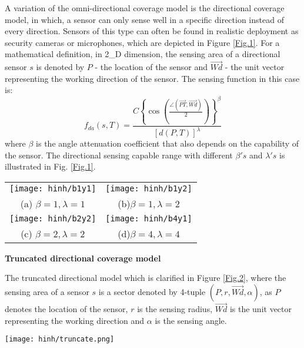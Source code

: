 \documentclass[final]{elsarticle}
\begin{document}
A variation of the omni-directional coverage model is the directional coverage model, in which, a sensor can only sense well in a specific direction instead of every direction. Sensors of this type can often be found in realistic deployment as security cameras or microphones, which are depicted in Figure \ref{Fig.1}. For a mathematical definition, in 2\_D dimension, the sensing area of a directional sensor $ s $ is denoted by $ P $ - the location of the sensor and $ \overrightarrow{Wd}$ - the unit vector representing the working direction of the sensor. The sensing function in this case is:
\begin{equation}
\label{eq2}
f_{da}({s},T) = \frac{{C{{\left\{ {\cos \left( {\frac{{\angle (\overrightarrow {PT} ,\overrightarrow {Wd}) }}{2}} \right)} \right\}}^\beta }}}{{{{\left[ {d(P,T)} \right]}^\lambda }}}
\end{equation}
where $\beta$ is the angle attenuation coefficient that also depends on the capability of the sensor. The directional sensing capable range with different $ \beta's $ and $ \lambda's $ is illustrated in Fig. \ref{Fig.1}. \\
\begin{figure*}[h]
	\begin{tabular}{cc}
		\texttt{[image: hinh/b1y1]}&\texttt{[image: hinh/b1y2]}\\
		(a) $\beta =1, \lambda=1 $ &(b)$ \beta=1, \lambda=2 $\\
		\texttt{[image: hinh/b2y2]}&\texttt{[image: hinh/b4y1]}\\
		(c) $ \beta=2, \lambda=2 $& (d)$ \beta=4, \lambda=4 $\\
	\end{tabular}
	\centering
	\caption{Illustration attenuated directional sensing model with different $ \beta's $ and $ \lambda's $
	}
	\label{Fig.1}       %
\end{figure*}

\noindent\textbf{Truncated directional coverage model} 

The truncated directional model which is clarified in Figure \ref{Fig.2}, where the sensing area of a sensor $ s $ is a sector denoted by 4-tuple $( P, r, \overrightarrow{Wd}, \alpha )$, as $ P $ denotes the location of the sensor, $ r $ is the sensing radius, $ \overrightarrow{Wd}$ is the unit vector representing the working direction and $ \alpha $ is the sensing angle. 
\begin{figure*}[h]
	\centering
	\texttt{[image: hinh/truncate.png]}
	\caption{Sensing capability of truncated directional sensor}
	\label{Fig.2}       %
\end{figure*}
\end{document}
